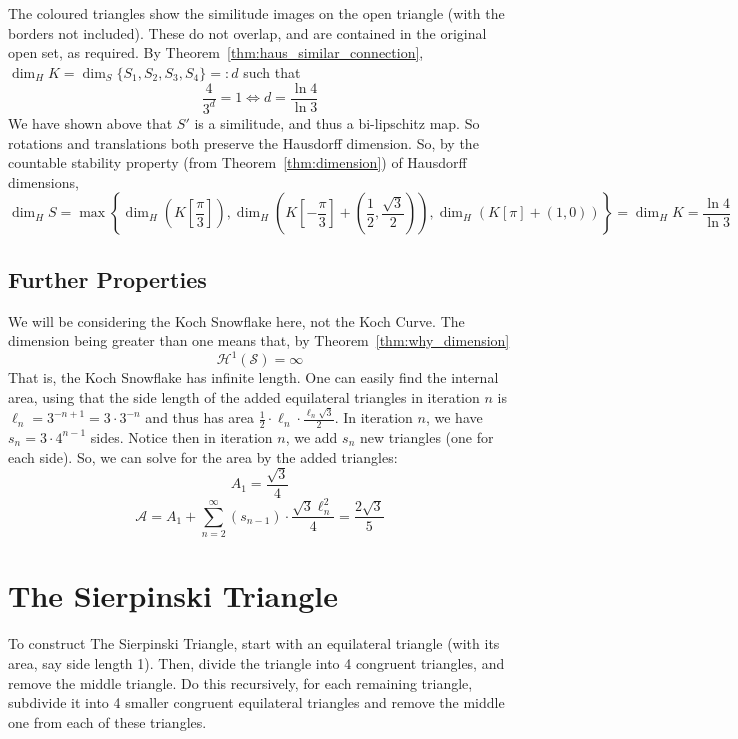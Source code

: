 \documentclass{article}
\theoremstyle{plain}
\theoremstyle{definition}
\theoremstyle{remark}
\begin{document}
~\\~\\
The coloured triangles show the similitude images on the open triangle (with the borders not included). These do not overlap, and are contained in the original open set, as required. By Theorem~\ref{thm:haus_similar_connection}, $\dim _HK = \dim _S \{S_1,S_2,S_3,S_4\} =:d$ such that
\[\frac{4}{3^d} = 1 \iff d = \frac{\ln 4}{ \ln 3}\] We have shown above that $S'$ is a similitude, and thus a bi-lipschitz map. So rotations and translations both preserve the Hausdorff dimension. So, by the countable stability property (from Theorem~\ref{thm:dimension}) of Hausdorff dimensions,
\[\dim_H S = \max \left \{\dim _H \left (K\left [ \frac{\pi}{3}\right ] \right ), \dim _H \left (K\left [ -\frac{\pi}{3}\right ]  + \left (\frac{1}{2}, \frac{\sqrt{3}}{2} \right )\right ), \dim _H \left (K\left [ \pi\right ] + (1,0) \right ) \right \} = \dim _H K = \frac{\ln 4}{\ln 3}\]

\subsection{Further Properties}
We will be considering the Koch Snowflake here, not the Koch Curve. The dimension being greater than one means that, by Theorem~\ref{thm:why_dimension} \[
\mathcal{H}^1(\mathcal{S}) = \infty
\]
That is, the Koch Snowflake has infinite length. One can easily find the internal area, using that the side length of the added equilateral triangles in iteration $n$ is $\ell _n = 3^{-n+1}=3\cdot 3^{-n}$ and thus has area $\frac{1}{2} \cdot \ell _n  \cdot \frac{\ell _n \sqrt{3}}{2}$. In iteration $n$, we have $s_n = 3 \cdot 4^{n-1} $ sides. Notice then in iteration $n$, we add $s_n$ new triangles (one for each side). So, we can solve for the area by the added triangles:
\[
A_1 = \frac{\sqrt{3}}{4}
\]
\[
\mathcal{A} = A_1 + \sum \limits _{n=2}^\infty (s_{n-1}) \cdot  \frac{\sqrt{3} \ell _n^2}{4} = \frac{2\sqrt{3}}{5}
\]

\newpage

\section{The Sierpinski Triangle}

To construct The Sierpinski Triangle, start with an equilateral triangle (with its area, say side length 1). Then, divide the triangle into 4 congruent triangles, and remove the middle triangle. Do this recursively, for each remaining triangle, subdivide it into 4 smaller congruent equilateral triangles and remove the middle one from each of these triangles.
\end{document}
